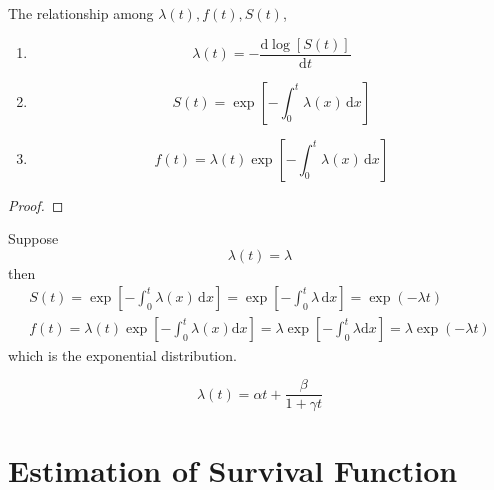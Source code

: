 \begin{property}
	The relationship among $\lambda(t),f(t),S(t)$,
	\begin{enumerate}
		\item
		      \begin{equation}
			      \lambda(t)=-\frac{\mathrm{d}\log [S(t)]}{\mathrm{d}t}
		      \end{equation}
		\item
		      \begin{equation}
			      S(t)=\exp\left[-\int_{0}^{t}\lambda(x)\,\mathrm{d}x\right]
		      \end{equation}
		\item
		      \begin{equation}
			      f(t)=\lambda(t)\exp\left[-\int_{0}^{t}\lambda(x)\,\mathrm{d}x\right]
		      \end{equation}
	\end{enumerate}
\end{property}

\begin{proof}

\end{proof}

\begin{example}
	Suppose
	\begin{equation}
		\lambda(t)=\lambda
	\end{equation}
	then
	\begin{gather*}
		S(t)=\exp\left[-\int_{0}^{t}\lambda(x)\,\mathrm{d}x\right]=\exp\left[-\int_{0}^{t}\lambda\,\mathrm{d}x\right]=\exp(-\lambda t) \\
		f(t)=\lambda(t)\exp\left[-\int_{0}^{t}\lambda(x)\mathrm{d}x\right]=\lambda\exp\left[-\int_{0}^{t}\lambda\mathrm{d}x\right]=\lambda\exp(-\lambda t)
	\end{gather*}
	which is the exponential distribution.
\end{example}

\begin{example}
	\begin{equation}
		\lambda(t)=\alpha t+\frac{\beta}{1+\gamma t}
	\end{equation}
\end{example}

\section{Estimation of Survival Function}

